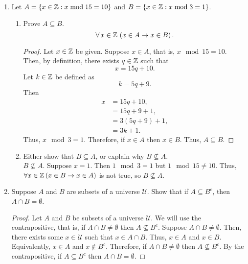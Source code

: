 \documentclass[a4paper, 12pt]{../../config/homework}
\begin{document}
\begin{enumerate}
\pagebreak
\item Let $A=\left\{ x\in\mathbb{Z} : x\;\text{mod}\; 15 = 10\right\}$ and $B=\left\{ x\in\mathbb{Z} : x\;\text{mod}\; 3 =1 \right\}$.
\begin{enumerate}[label=(\alph*)]
\item Prove $A \subseteq B$.
\[\forall\,x \in \mathbb{Z}\,\left(x\in A \rightarrow x\in B\right).\]
\begin{proof}
Let $x\in\mathbb{Z}$ be given. Suppose $x\in A$, that is, $x\mod15=10$. Then, by definition, there exists $q\in\mathbb{Z}$ such that
\[x = 15q + 10.\]
Let $k\in\mathbb{Z}$ be defined as
\[k = 5q + 9.\]
Then
\begin{align*}
x &= 15q + 10,
\\&= 15q + 9 + 1,
\\&= 3(5q + 9) + 1,
\\&= 3k + 1.
\end{align*}
Thus, $x\mod3 = 1$. Therefore, if $x\in A$ then $x\in B$. Thus, $A \subseteq B$.
\end{proof}
\item Either show that $B\subseteq A$, or explain why $B \nsubseteq A$.
\\$B\nsubseteq A$. Suppose $x = 1$. Then $1\mod3 = 1$ but $1\mod15\neq 10$. Thus, $\forall x \in \mathbb{Z}\, (x\in B \rightarrow x \in A)$ is not true, so $B \nsubseteq A$.
\end{enumerate}

\vspace{2\singlelineheight}
\item Suppose $A$ and $B$ are subsets of a universe $\mathcal{U}$. Show that if $A\subseteq B^c$, then $A\cap B = \emptyset$.
\begin{proof}
Let \(A\) and \(B\) be subsets of a universe \(\mathcal{U}\). We will use the contrapositive, that is, if \(A \cap B \ne \emptyset \) then \(A \nsubseteq B^c\). Suppose \(A \cap B \ne \emptyset \). Then, there exists some \(x\in\mathcal{U}\) such that \(x\in A\cap B\). Thus, \(x\in A\) and \(x \in B\). Equivalently, \(x\in A\) and \(x \notin B^c\). Therefore, if \(A \cap B \ne \emptyset \) then \(A \nsubseteq B^c\). By the contrapositive, if \(A \subseteq B^c\) then \(A \cap B = \emptyset \).
\end{proof}

\end{enumerate}
\end{document}
